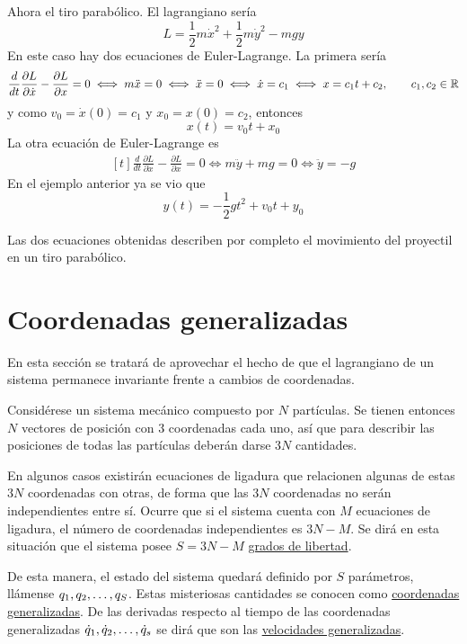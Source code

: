 \documentclass[12pt]{report}
\begin{document}
\begin{example}
Ahora el tiro parabólico. El lagrangiano sería
\[L = \frac{1}{2}m\dot{x}^2+\frac{1}{2}m\dot{y}^2-mgy\]
En este caso hay dos ecuaciones de Euler-Lagrange. La primera sería
\[
\begin{aligned}[t]
\frac{d}{dt}\frac{\partial L}{\partial \dot{x}} - \frac{\partial L}{\partial x} = 0 \iff m \ddot{x} = 0 \iff \ddot{x} = 0 \iff \dot{x} = c_1 \iff x = c_1t + c_2, \qquad c_1, c_2 \in \mathbb R
\end{aligned}
\]
y como $v_0 = \dot{x}(0) = c_1$ y $x_0 = x(0) = c_2$, entonces
\[x(t) = v_0t+x_0\]
La otra ecuación de Euler-Lagrange es
\[
\begin{aligned}[t]
\frac{d}{dt}\frac{\partial L}{\partial \dot{x}} - \frac{\partial L}{\partial x} = 0 \iff m \ddot{y}+mg = 0 \iff \ddot{y} = -g
\end{aligned}
\]
En el ejemplo anterior ya se vio que
\[y(t) = -\frac{1}{2}gt^2+v_0t+y_0\]

Las dos ecuaciones obtenidas describen por completo el movimiento del proyectil en un tiro parabólico.
\end{example}

\section{Coordenadas generalizadas}

En esta sección se tratará de aprovechar el hecho de que el lagrangiano de un sistema permanece invariante frente a cambios de coordenadas. 

\vspace{2mm}
Considérese un sistema mecánico compuesto por $N$ partículas. Se tienen entonces $N$ vectores de posición con $3$ coordenadas cada uno, así que para describir las posiciones de todas las partículas deberán darse $3N$ cantidades. 

\vspace{2mm}
En algunos casos existirán ecuaciones de ligadura que relacionen algunas de estas $3N$ coordenadas con otras, de forma que las $3N$ coordenadas no serán independientes entre sí. Ocurre que si el sistema cuenta con $M$ ecuaciones de ligadura, el número de coordenadas independientes es $3N-M$. Se dirá en esta situación que el sistema posee $S = 3N-M$ \ul{grados de libertad}.

\vspace{2mm}
De esta manera, el estado del sistema quedará definido por $S$ parámetros, llámense $q_1,q_2,\mathellipsis,q_S$. Estas misteriosas cantidades se conocen como \ul{coordenadas generalizadas}. De las derivadas respecto al tiempo de las coordenadas generalizadas $\dot{q}_1,\dot{q}_2,\mathellipsis,\dot{q}_s$ se dirá que son las \ul{velocidades generalizadas}.
\end{document}
